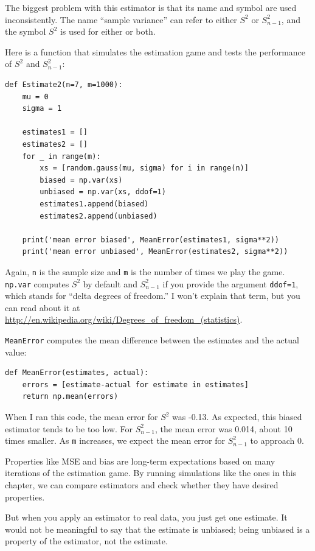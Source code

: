\documentclass[12pt]{book}
\theoremstyle{exercise}
\begin{document}
The biggest problem with this estimator is that its name and symbol
are used inconsistently.  The name ``sample variance'' can refer to
either $S^2$ or $S_{n-1}^2$, and the symbol $S^2$ is used
for either or both.

Here is a function that simulates the estimation game and tests
the performance of $S^2$ and $S_{n-1}^2$:

\begin{verbatim}
def Estimate2(n=7, m=1000):
    mu = 0
    sigma = 1

    estimates1 = []
    estimates2 = []
    for _ in range(m):
        xs = [random.gauss(mu, sigma) for i in range(n)]
        biased = np.var(xs)
        unbiased = np.var(xs, ddof=1)
        estimates1.append(biased)
        estimates2.append(unbiased)

    print('mean error biased', MeanError(estimates1, sigma**2))
    print('mean error unbiased', MeanError(estimates2, sigma**2))
\end{verbatim}

Again, {\tt n} is the sample size and {\tt m} is the number of times
we play the game.  {\tt np.var} computes $S^2$ by default and
$S_{n-1}^2$ if you provide the argument {\tt ddof=1}, which stands for
``delta degrees of freedom.''  I won't explain that term, but you can read
about it at
\url{http://en.wikipedia.org/wiki/Degrees_of_freedom_(statistics)}.%

{\tt MeanError} computes the mean difference between the estimates
and the actual value:

\begin{verbatim}
def MeanError(estimates, actual):
    errors = [estimate-actual for estimate in estimates]
    return np.mean(errors)
\end{verbatim}

When I ran this code, the mean error for $S^2$ was -0.13.  As
expected, this biased estimator tends to be too low.  For $S_{n-1}^2$,
the mean error was 0.014, about 10 times smaller.  As {\tt m}
increases, we expect the mean error for $S_{n-1}^2$ to approach 0.%

Properties like MSE and bias are long-term expectations based on
many iterations of the estimation game.  By running simulations like
the ones in this chapter, we can compare estimators and check whether
they have desired properties.%
%

But when you apply an estimator to real
data, you just get one estimate.  It would not be meaningful to say
that the estimate is unbiased; being unbiased is a property of the
estimator, not the estimate.
\end{document}
